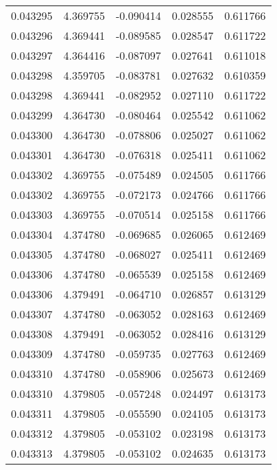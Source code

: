 \begin{tabular}{lrrrr}
0.043295    &  4.369755 & -0.090414 &  0.028555 &             0.611766 \\
0.043296    &  4.369441 & -0.089585 &  0.028547 &             0.611722 \\
0.043297    &  4.364416 & -0.087097 &  0.027641 &             0.611018 \\
0.043298    &  4.359705 & -0.083781 &  0.027632 &             0.610359 \\
0.043298    &  4.369441 & -0.082952 &  0.027110 &             0.611722 \\
0.043299    &  4.364730 & -0.080464 &  0.025542 &             0.611062 \\
0.043300    &  4.364730 & -0.078806 &  0.025027 &             0.611062 \\
0.043301    &  4.364730 & -0.076318 &  0.025411 &             0.611062 \\
0.043302    &  4.369755 & -0.075489 &  0.024505 &             0.611766 \\
0.043302    &  4.369755 & -0.072173 &  0.024766 &             0.611766 \\
0.043303    &  4.369755 & -0.070514 &  0.025158 &             0.611766 \\
0.043304    &  4.374780 & -0.069685 &  0.026065 &             0.612469 \\
0.043305    &  4.374780 & -0.068027 &  0.025411 &             0.612469 \\
0.043306    &  4.374780 & -0.065539 &  0.025158 &             0.612469 \\
0.043306    &  4.379491 & -0.064710 &  0.026857 &             0.613129 \\
0.043307    &  4.374780 & -0.063052 &  0.028163 &             0.612469 \\
0.043308    &  4.379491 & -0.063052 &  0.028416 &             0.613129 \\
0.043309    &  4.374780 & -0.059735 &  0.027763 &             0.612469 \\
0.043310    &  4.374780 & -0.058906 &  0.025673 &             0.612469 \\
0.043310    &  4.379805 & -0.057248 &  0.024497 &             0.613173 \\
0.043311    &  4.379805 & -0.055590 &  0.024105 &             0.613173 \\
0.043312    &  4.379805 & -0.053102 &  0.023198 &             0.613173 \\
0.043313    &  4.379805 & -0.053102 &  0.024635 &             0.613173 \\

\end{tabular}
